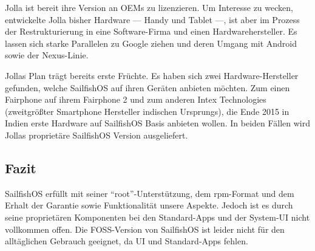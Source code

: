 Jolla ist bereit ihre Version an OEMs zu lizenzieren. Um Interesse zu wecken, entwickelte Jolla bisher Hardware --- Handy\thinspace\cite{online:jolla-smartphone} und Tablet\thinspace\cite{online:jolla-tablet} ---, ist aber im Prozess der Restrukturierung in eine Software-Firma und einen Hardwarehersteller\thinspace\cite{online:jolla-googlelike}. Es lassen sich starke Parallelen zu Google ziehen und deren Umgang mit Android sowie der Nexus-Linie.

Jollas Plan trägt bereits erste Früchte. Es haben sich zwei Hardware-Hersteller gefunden, welche \mbox{SailfishOS} auf ihren Geräten anbieten möchten. Zum einen Fairphone auf ihrem Fairphone 2\thinspace\cite{online:jolla-fairphone2} und zum anderen Intex Technologies (zweitgrößter Smartphone Hersteller indischen Ursprungs), die Ende 2015 in Indien erste Hardware auf \mbox{SailfishOS} Basis anbieten wollen\thinspace\cite{online:jolla-intex-pdf}. In beiden Fällen wird Jollas proprietäre \mbox{SailfishOS} Version ausgeliefert.
\newline

\subsection{Fazit}
\mbox{SailfishOS} erfüllt mit seiner \mbox{``root''-Unterstützung}, dem \mbox{rpm-Format} und dem Erhalt der Garantie sowie Funktionalität unsere Aspekte. Jedoch ist es durch seine proprietären Komponenten bei den \mbox{Standard-Apps} und der \mbox{System-UI} nicht vollkommen offen. Die \mbox{FOSS-Version} von \mbox{SailfishOS} ist leider nicht für den alltäglichen Gebrauch geeignet, da UI und \mbox{Standard-Apps} fehlen.